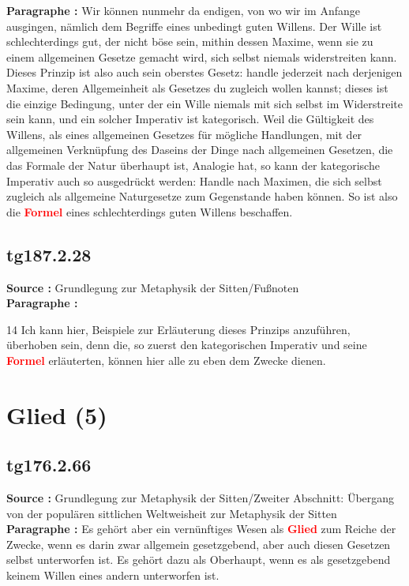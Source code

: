 \documentclass[a4paper,12pt,twoside]{book}
\newcommand{\match}[1]{\textcolor{red}{\textbf{#1}}}
\newcommand{\unnumberedsection}[1]{
	\section*{#1}
	\addcontentsline{toc}{section}{#1}
	\markright{#1}
}
\begin{document}
	\noindent\textbf{Paragraphe : }Wir können nunmehr da endigen, von wo wir im Anfange ausgingen, nämlich dem Begriffe eines unbedingt guten Willens. Der Wille ist schlechterdings gut, der nicht böse sein, mithin dessen Maxime, wenn sie zu einem allgemeinen Gesetze gemacht wird, sich selbst niemals widerstreiten kann. Dieses Prinzip ist also auch sein oberstes Gesetz: handle jederzeit nach derjenigen Maxime, deren Allgemeinheit als Gesetzes du zugleich wollen kannst; dieses ist  die einzige Bedingung, unter der ein Wille niemals mit sich selbst im Widerstreite sein kann, und ein solcher Imperativ ist kategorisch. Weil die Gültigkeit des Willens, als eines allgemeinen Gesetzes für mögliche Handlungen, mit der allgemeinen Verknüpfung des Daseins der Dinge nach allgemeinen Gesetzen, die das Formale der Natur überhaupt ist, Analogie hat, so kann der kategorische Imperativ auch so ausgedrückt werden: Handle nach Maximen, die sich selbst zugleich als allgemeine Naturgesetze zum Gegenstande haben können. So ist also die \match{Formel} eines schlechterdings guten Willens beschaffen. 
	
	\subsection*{tg187.2.28} 
	\textbf{Source : }Grundlegung zur Metaphysik der Sitten/Fußnoten\\  
	
	\noindent\textbf{Paragraphe : }
	
	14 Ich kann hier, Beispiele zur Erläuterung dieses Prinzips anzuführen, überhoben sein, denn die, so zuerst den kategorischen Imperativ und seine \match{Formel} erläuterten, können hier alle zu eben dem Zwecke dienen. 
	
	\unnumberedsection{Glied (5)} 
	\subsection*{tg176.2.66} 
	\textbf{Source : }Grundlegung zur Metaphysik der Sitten/Zweiter Abschnitt: Übergang von der populären sittlichen Weltweisheit zur Metaphysik der Sitten\\  
	
	\noindent\textbf{Paragraphe : }Es gehört aber ein vernünftiges Wesen als \match{Glied} zum Reiche der Zwecke, wenn es darin zwar allgemein gesetzgebend, aber auch diesen Gesetzen selbst unterworfen ist. Es gehört dazu als Oberhaupt, wenn es als gesetzgebend keinem Willen eines andern unterworfen ist. 
	
\end{document}
